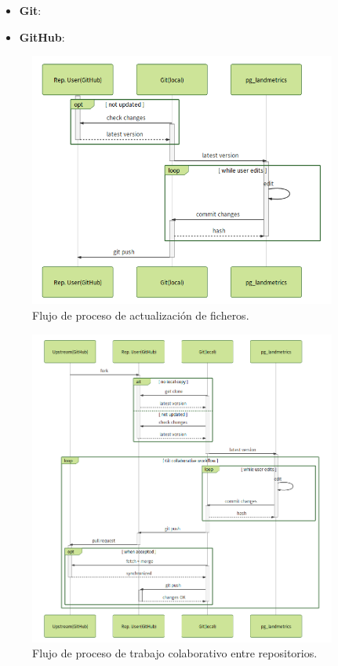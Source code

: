 \begin{itemize}
\item\textbf{Git}: 
\item\textbf{GitHub}: 
\end{itemize}



\begin{figure}
\begin{center}
\includegraphics[width=0.9\textwidth]{Metodologia/Figs/diary.png}
\caption{Flujo de proceso de actualización de ficheros. \label{fig:diary}}
\end{center}
\end{figure}



\begin{figure}
\begin{center}
\includegraphics[width=0.9\textwidth]{Metodologia/Figs/pullrequest.png}
\caption{Flujo de proceso de trabajo colaborativo entre repositorios. \label{fig:pullrequest}}
\end{center}
\end{figure}


